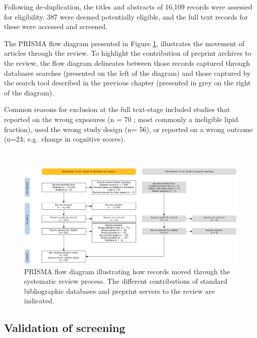 \documentclass[a4paper, twoside]{templates/ociamthesis}
\newcommand{\blandscape}{\begin{landscape}}
\newcommand{\elandscape}{\end{landscape}}
\begin{document}
Following de-duplication, the titles and abstracts of 16,109 records were assessed for eligibility. 387 were deemed potentially eligible, and the full text records for these were accessed and screened.

The PRISMA flow diagram presented in Figure \ref{fig:prisma-flow-fig}, illustrates the movement of articles through the review. To highlight the contribution of preprint archives to the review, the flow diagram delineates between those records captured through databases searches (presented on the left of the diagram) and those captured by the search tool described in the previous chapter (presented in grey on the right of the diagram).

Common reasons for exclusion at the full text-stage included studies that reported on the wrong exposures (n = 70 ; most commonly a ineligible lipid fraction), used the wrong study design (n= 56), or reported on a wrong outcome (n=24; e.g.~change in cognitive scores).

\blandscape{}

~





\begin{figure}[H]
\includegraphics[width=1\linewidth]{figures/sys-rev/prismaflow} \caption[PRISMA flow diagram]{PRISMA flow diagram illustrating how records moved through the systematic review process. The different contributions of standard bibliographic databases and preprint servers to the review are indicated.}\label{fig:prisma-flow-fig}
\end{figure}

\elandscape{}

\hypertarget{validation-of-screening}{%
\subsection{Validation of screening}\label{validation-of-screening}}
\end{document}
